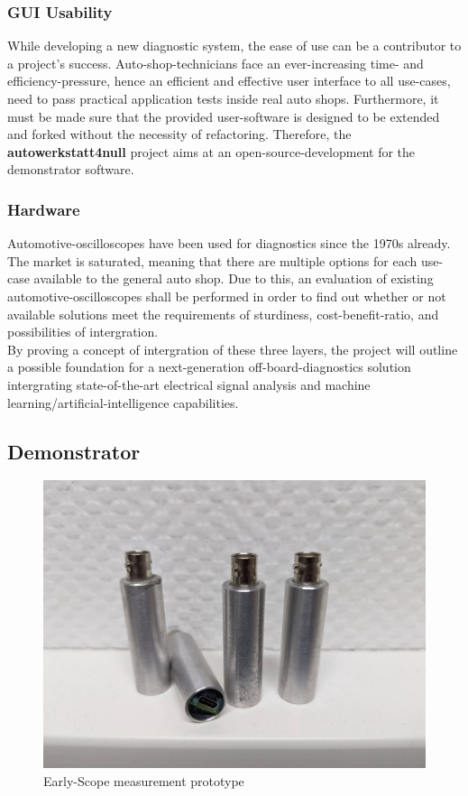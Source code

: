 \documentclass[conference,a4paper]{IEEEtran}
\begin{document}
\subsubsection{GUI Usability}
While developing a new diagnostic system, the ease of use can be a contributor to a project's success.
Auto-shop-technicians face an ever-increasing time- and efficiency-pressure, hence an efficient and effective user interface to all use-cases, need to pass practical application tests inside real auto shops.
Furthermore, it must be made sure that the provided user-software is designed to be extended and forked without the necessity of refactoring.
Therefore, the \textbf{autowerkstatt4null} project aims at an open-source-development for the demonstrator software.

\subsubsection{Hardware}
Automotive-oscilloscopes have been used for diagnostics since the 1970s already.
The market is saturated, meaning that there are multiple options for each use-case available to the general auto shop.
Due to this, an evaluation of existing automotive-oscilloscopes shall be performed in order to find out whether or not available solutions meet the requirements of sturdiness, cost-benefit-ratio, and possibilities of intergration. \\

By proving a concept of intergration of these three layers, the project will outline a possible foundation for a next-generation off-board-diagnostics solution intergrating state-of-the-art electrical signal analysis and machine learning/artificial-intelligence capabilities.


\subsection{Demonstrator}
\begin{figure}[ht]
  \centering
  \includegraphics[width=0.9\linewidth]{figures/early_prototype.jpg}
  \caption{Early-Scope measurement prototype}
  \label{fig:early-scope}
\end{figure}
\end{document}
